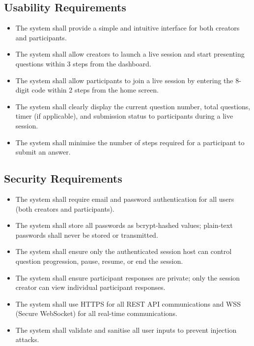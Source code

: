 \documentclass[12pt,a4paper]{article}
\begin{document}
\subsection{Usability Requirements}
\begin{itemize}
  \item The system shall provide a simple and intuitive interface for both creators
        and participants.
  \item The system shall allow creators to launch a live session and start presenting
        questions within 3 steps from the dashboard.
  \item The system shall allow participants to join a live session by entering the
        8-digit code within 2 steps from the home screen.
  \item The system shall clearly display the current question number, total questions,
        timer (if applicable), and submission status to participants during a live
        session.
  \item The system shall minimise the number of steps required for a participant to
        submit an answer.
\end{itemize}

\subsection{Security Requirements}
\begin{itemize}
  \item The system shall require email and password authentication for all users
        (both creators and participants).
  \item The system shall store all passwords as bcrypt-hashed values; plain-text
        passwords shall never be stored or transmitted.
  \item The system shall ensure only the authenticated session host can control
        question progression, pause, resume, or end the session.
  \item The system shall ensure participant responses are private; only the session
        creator can view individual participant responses.
  \item The system shall use HTTPS for all REST API communications and WSS (Secure
        WebSocket) for all real-time communications.
  \item The system shall validate and sanitise all user inputs to prevent injection
        attacks.
\end{itemize}
\end{document}
